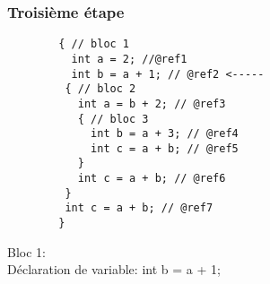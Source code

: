 \documentclass{../../res/univ-projet}
\begin{document}
    \subsubsection{Troisième étape}
    \begin{multicols}{2}
        
        \begin{verbatim}
        { // bloc 1
          int a = 2; //@ref1
          int b = a + 1; // @ref2 <-----
         { // bloc 2
           int a = b + 2; // @ref3
           { // bloc 3
             int b = a + 3; // @ref4
             int c = a + b; // @ref5
           }
           int c = a + b; // @ref6
         }
         int c = a + b; // @ref7
        }

        \end{verbatim}

      \columnbreak
        Bloc 1:\\
        Déclaration de variable: int b = a + 1;\\
      \end{multicols}
\end{document}
